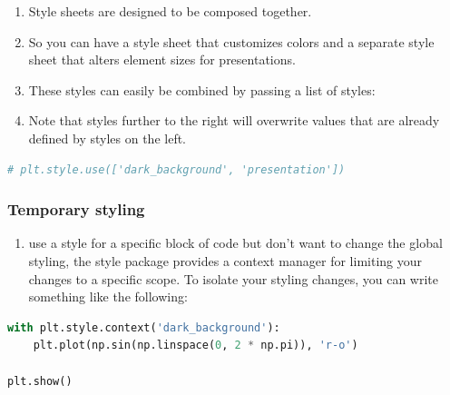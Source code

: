 \documentclass[UTF8,a4paper,12pt]{ctexart}  %
\providecommand{\tightlist}{\setlength{\itemsep}{0pt}\setlength{\parskip}{0pt}}
\begin{document}
\begin{enumerate}
\def\labelenumi{\arabic{enumi}.}
\tightlist
\item
  Style sheets are designed to be composed together.
\item
  So you can have a style sheet that customizes colors and a separate
  style sheet that alters element sizes for presentations.
\item
  These styles can easily be combined by passing a list of styles:
\item
  Note that styles further to the right will overwrite values that are
  already defined by styles on the left.
\end{enumerate}

\begin{lstlisting}[language=Python]
# plt.style.use(['dark_background', 'presentation'])
\end{lstlisting}

\hypertarget{temporary-styling}{%
\subsubsection{Temporary styling}\label{temporary-styling}}

\begin{enumerate}
\def\labelenumi{\arabic{enumi}.}
\tightlist
\item
  use a style for a specific block of code but don't want to change
  the global styling, the style package provides a context manager for
  limiting your changes to a specific scope. To isolate your styling
  changes, you can write something like the following:
\end{enumerate}

\begin{lstlisting}[language=Python]
with plt.style.context('dark_background'):
    plt.plot(np.sin(np.linspace(0, 2 * np.pi)), 'r-o')

plt.show()
\end{lstlisting}
\end{document}
